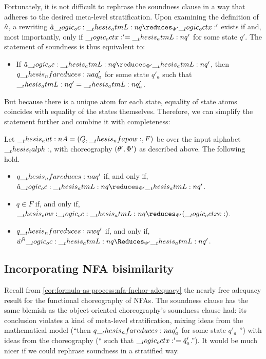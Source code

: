 Fortunately, it is not difficult to rephrase the soundness clause in a way that adheres to the desired meta-level stratification.
Upon examining the definition of $\hat{a}$, a rewriting $\defp{a} \oc \atmL{q} \reduces_{\orsig'} \octx'$ exists if and, most importantly, only if $\__logic_octx:' = \__thesis_atmL:n {q}'$ for some state $q'$.
The statement of soundness is thus equivalent to:
\begin{itemize}
\item If $\defp{a} \oc \atmL{q} \reduces_{\orsig'} \atmL{q}'$, then $q \nfareduces[a] q'_a$ for some state $q'_a$ such that $\__thesis_atmL:n {q}' = \__thesis_atmL:n {q}'_a$.
\end{itemize}
But because there is a unique atom for each state, equality of state atoms coincides with equality of the states themselves.
Therefore, we can simplify the statement further and combine it with completeness:
\begin{corollary}\label{cor:formula-as-process:nfa-oochor-adequacy-simple}
  Let $\__thesis_aut:n {A} = (Q, \__thesis_nfapow:, F)$ be  over the input alphabet $\__thesis_ialph:$, with choreography $(\theta', \Phi')$ as described above.
  The following hold.
  \begin{itemize}[nosep]
  \item $q \nfareduces[a] q'$ if, and only if, $\defp{a} \oc \atmL{q} \reduces_{\orsig'} \atmL{q}'$.
  \item $q \in F$ if, and only if, $\defp{\eow} \oc \atmL{q} \reduces_{\orsig'} (\octxe)$.
  \item $q \nfareduces[w] q'$ if, and only if, $\rev{\defp{w}} \oc \atmL{q} \Reduces_{\orsig'} \atmL{q}'$.
  \end{itemize}
\end{corollary}

\subsection{Incorporating \acs*{NFA} bisimilarity}\label{sec:formula-as-process:nfa-bisim}

Recall from \cref{cor:formula-as-process:nfa-fnchor-adequacy} the nearly free adequacy result for the functional choreography of \acp{NFA}.
%
\cornfafnchoradequacy*
%
The soundness clause has the same blemish as the object-oriented choreography's soundness clause had: its conclusion violates a kind of meta-level stratification, mixing ideas from the mathematical model (\enquote{then $q \nfareduces[a] q'_a$ for some state $q'_a$ \textelp{}}) with ideas from the choreography (\enquote{\textelp{} such that $\__logic_octx:' = \hat{q}'_a$.}).
It would be much nicer if we could rephrase soundness in a stratified way.


